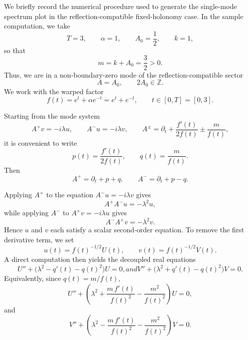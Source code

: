 \documentclass[11pt]{article}
\theoremstyle{definition}
\numberwithin{equation}{section}
\begin{document}
We briefly record the numerical procedure used to generate the single-mode spectrum plot in the
reflection-compatible fixed-holonomy case. In the sample computation, we take
\begin{equation}
T=3,\qquad \alpha=1,\qquad A_0=\frac12,\qquad k=1,
\end{equation}
so that
\begin{equation}
m=k+A_0=\frac32>0.
\end{equation}
Thus, we are in a non-boundary-zero mode of the reflection-compatible sector
\begin{equation}
A=A_0,\qquad 2A_0\in\mathbb Z.
\end{equation}
We work with the warped factor
\begin{equation}
f(t)=e^t+\alpha e^{-t}=e^t+e^{-t},
\qquad t\in[0,T]=[0,3].
\end{equation}

Starting from the mode system
\begin{equation}
A^+v=-i\lambda u,\qquad A^-u=-i\lambda v,
\qquad
A^\pm=\partial_t+\frac{f'(t)}{2f(t)}\pm\frac{m}{f(t)},
\end{equation}
it is convenient to write
\begin{equation}
p(t)=\frac{f'(t)}{2f(t)},
\qquad
q(t)=\frac{m}{f(t)}.
\end{equation}
Then
\begin{equation}
A^+=\partial_t+p+q,
\qquad
A^-=\partial_t+p-q.
\end{equation}

Applying \(A^+\) to the equation \(A^-u=-i\lambda v\) gives
\begin{equation}
A^+A^-u=-\lambda^2 u,
\end{equation}
while applying \(A^-\) to \(A^+v=-i\lambda u\) gives
\begin{equation}
A^-A^+v=-\lambda^2 v.
\end{equation}
Hence \(u\) and \(v\) each satisfy a scalar second-order equation. To remove the first derivative
term, we set
\begin{equation}
u(t)=f(t)^{-1/2}U(t),
\qquad
v(t)=f(t)^{-1/2}V(t).
\end{equation}
A direct computation then yields the decoupled real equations
\begin{subequations}
\begin{equation}
U''+\bigl(\lambda^2-q'(t)-q(t)^2\bigr)U=0,
\end{equation}
and
\begin{equation}
V''+\bigl(\lambda^2+q'(t)-q(t)^2\bigr)V=0.
\end{equation}
\end{subequations}
Equivalently, since \(q(t)=m/f(t)\),
\begin{equation}
U''+\left(\lambda^2+\frac{m\,f'(t)}{f(t)^2}-\frac{m^2}{f(t)^2}\right)U=0,
\end{equation}
and
\begin{equation}
V''+\left(\lambda^2-\frac{m\,f'(t)}{f(t)^2}-\frac{m^2}{f(t)^2}\right)V=0.
\end{equation}
\end{document}
